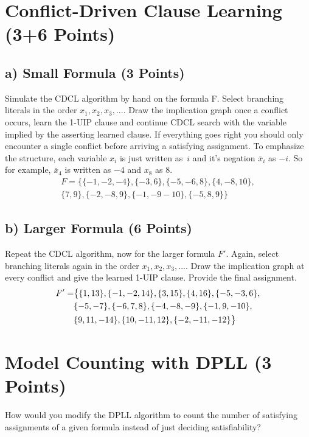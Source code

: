 \documentclass[a4paper]{article}
\begin{document}

\section{Conflict-Driven Clause Learning (3+6 Points)}
\subsection{a) Small Formula (3 Points)}
Simulate the CDCL algorithm by hand on the formula F. Select branching literals in the order $x_1,x_2,x_3, ...$. Draw the implication graph once a conflict occurs, learn the 1-UIP clause and continue CDCL search with the variable implied by the asserting learned clause. If everything goes right you should only encounter a single conflict before arriving a satisfying assignment. To emphasize the structure, each variable $x_i$ is just written as~$i$ and it's negation $\bar x_i$ as $-i$. So for example, $\bar x_4$ is written as $-4$ and $x_8$ as 8.
\begin{align}
	F = \bigl\{\{-1,-2,-4\}, \{-3, 6\}, \{-5,-6, 8\}, \{4,-8,10\}, \\ \{7,9\}, \{-2, -8, 9\}, \{-1,-9-10\},  \{-5,8,9\}\bigr\}
\end{align}

\subsection{b) Larger Formula (6 Points)}
Repeat the CDCL algorithm, now for the larger formula $F'$. Again, select branching literals again in the order $x_1,x_2,x_3, ...$. Draw the implication graph at every conflict and give the learned 1-UIP clause. Provide the final assignment.
\begin{align}
	\centering
	F' = &\bigl\{\{1, 13\}, \{-1, -2, 14\}, \{3, 15\}, \{4, 16\},\{-5, -3, 6\},  \notag \\
	\quad & \{-5, -7\}, \{-6, 7, 8\}, \{-4, -8, -9\}, \{-1, 9, -10\},\notag \\
	\quad & \{9, 11, -14\}, \{10, -11, 12\}, \{-2, -11, -12\}\bigr\}
\end{align}


\section{Model Counting with DPLL (3 Points)}

How would you modify the DPLL algorithm to count the number of satisfying assignments of a given formula instead of just deciding satisfiability?
\end{document}
